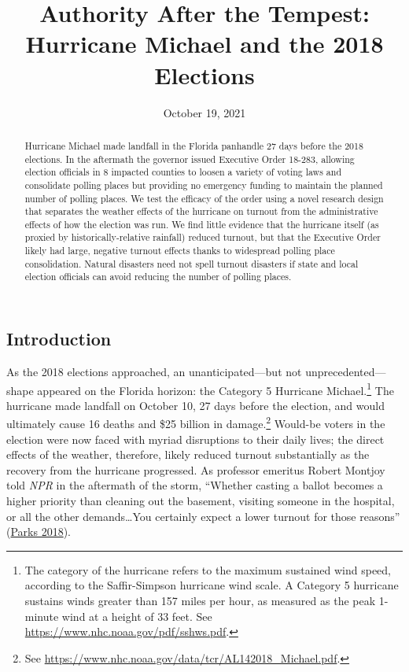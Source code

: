 \documentclass[
  12pt,
]{article}
\title{Authority After the Tempest: Hurricane Michael and the 2018 Elections}
\author{}
\date{\vspace{-2.5em}October 19, 2021}
\begin{document}
\maketitle
\begin{abstract}
Hurricane Michael made landfall in the Florida panhandle 27 days before the 2018 elections. In the aftermath the governor issued Executive Order 18-283, allowing election officials in 8 impacted counties to loosen a variety of voting laws and consolidate polling places but providing no emergency funding to maintain the planned number of polling places. We test the efficacy of the order using a novel research design that separates the weather effects of the hurricane on turnout from the administrative effects of how the election was run. We find little evidence that the hurricane itself (as proxied by historically-relative rainfall) reduced turnout, but that the Executive Order likely had large, negative turnout effects thanks to widespread polling place consolidation. Natural disasters need not spell turnout disasters if state and local election officials can avoid reducing the number of polling places.
\end{abstract}

\pagebreak

\doublespacing

\hypertarget{introduction}{%
\subsection*{Introduction}\label{introduction}}

As the 2018 elections approached, an unanticipated---but not unprecedented---shape appeared on the Florida horizon: the Category 5 Hurricane Michael.\footnote{The category of the hurricane refers to the maximum sustained wind speed, according to the Saffir-Simpson hurricane wind scale. A Category 5 hurricane sustains winds greater than 157 miles per hour, as measured as the peak 1-minute wind at a height of 33 feet. See \url{https://www.nhc.noaa.gov/pdf/sshws.pdf}.} The hurricane made landfall on October 10, 27 days before the election, and would ultimately cause 16 deaths and \$25 billion in damage.\footnote{See \url{https://www.nhc.noaa.gov/data/tcr/AL142018_Michael.pdf}.} Would-be voters in the election were now faced with myriad disruptions to their daily lives; the direct effects of the weather, therefore, likely reduced turnout substantially as the recovery from the hurricane progressed. As professor emeritus Robert Montjoy told \emph{NPR} in the aftermath of the storm, ``Whether casting a ballot becomes a higher priority than cleaning out the basement, visiting someone in the hospital, or all the other demands\ldots You certainly expect a lower turnout for those reasons'' (\protect\hyperlink{ref-Parks2018}{Parks 2018}).
\end{document}

